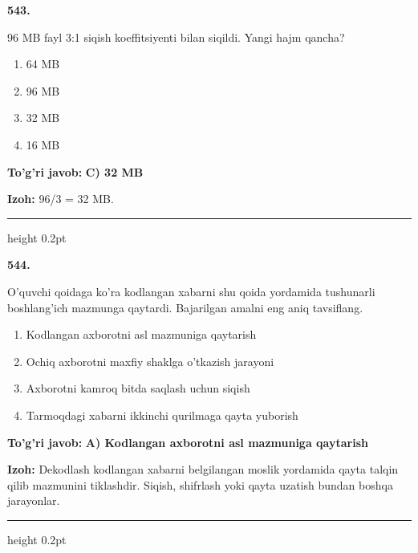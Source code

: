\documentclass[10pt,a4paper,oneside]{article}
\begin{document}
\noindent\textbf{\color{ink}543.}
\par
96 MB fayl 3:1 siqish koeffitsiyenti bilan siqildi. Yangi hajm qancha?
\begin{enumerate}[label=\Alph*),leftmargin=9mm]
\item 64 MB
\item 96 MB
\item 32 MB
\item 16 MB
\end{enumerate}
\begin{tcolorbox}[enhanced,breakable,colback=teal!4,colframe=teal!50!black,boxrule=0.5pt,arc=1.1mm,left=3mm,right=3mm,top=1.7mm,bottom=1.7mm,before skip=2mm,after skip=2mm]
\textbf{\color{teal}To'g'ri javob:} \textbf{C) 32 MB}
\par\smallskip
\textbf{Izoh:} 96/3 = 32 MB.
\end{tcolorbox}
\vspace{2mm}\hrule height 0.2pt \vspace{3mm}

\noindent\textbf{\color{ink}544.}
\par
O'quvchi qoidaga ko'ra kodlangan xabarni shu qoida yordamida tushunarli boshlang'ich mazmunga qaytardi. Bajarilgan amalni eng aniq tavsiflang.
\begin{enumerate}[label=\Alph*),leftmargin=9mm]
\item Kodlangan axborotni asl mazmuniga qaytarish
\item Ochiq axborotni maxfiy shaklga o'tkazish jarayoni
\item Axborotni kamroq bitda saqlash uchun siqish
\item Tarmoqdagi xabarni ikkinchi qurilmaga qayta yuborish
\end{enumerate}
\begin{tcolorbox}[enhanced,breakable,colback=teal!4,colframe=teal!50!black,boxrule=0.5pt,arc=1.1mm,left=3mm,right=3mm,top=1.7mm,bottom=1.7mm,before skip=2mm,after skip=2mm]
\textbf{\color{teal}To'g'ri javob:} \textbf{A) Kodlangan axborotni asl mazmuniga qaytarish}
\par\smallskip
\textbf{Izoh:} Dekodlash kodlangan xabarni belgilangan moslik yordamida qayta talqin qilib mazmunini tiklashdir. Siqish, shifrlash yoki qayta uzatish bundan boshqa jarayonlar.
\end{tcolorbox}
\vspace{2mm}\hrule height 0.2pt \vspace{3mm}
\end{document}
